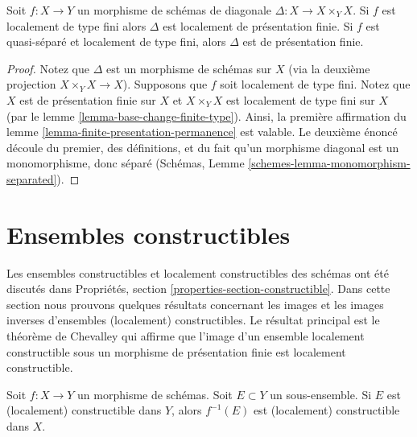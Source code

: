 \begin{lemma}
\label{lemma-diagonal-morphism-finite-type}
Soit $f : X \to Y$ un morphisme de schémas de diagonale $\Delta : X \to X \times_Y X$.
Si $f$ est localement de type fini alors $\Delta$
est localement de présentation finie. Si $f$ est quasi-séparé et
localement de type fini, alors $\Delta$ est de présentation finie.
\end{lemma}

\begin{proof}
Notez que $\Delta$ est un morphisme de schémas sur $X$
(via la deuxième projection $X \times_Y X \to X$). Supposons que $f$
soit localement de type fini. Notez que $X$ est de présentation
finie sur $X$ et $X \times_Y X$ est localement de type fini sur $X$
(par le lemme \ref{lemma-base-change-finite-type}).
Ainsi, la première affirmation du lemme
\ref{lemma-finite-presentation-permanence} est valable. Le deuxième énoncé découle du premier,
des définitions, et du fait qu'un morphisme diagonal est un monomorphisme,
donc séparé (Schémas, Lemme \ref{schemes-lemma-monomorphism-separated}).
\end{proof}








\section{Ensembles constructibles}
\label{section-constructible}

\noindent
Les ensembles constructibles et localement constructibles des schémas ont été discutés
dans Propriétés, section \ref{properties-section-constructible}. Dans cette section nous prouvons
quelques résultats concernant les images et les images inverses d'ensembles
(localement) constructibles. Le résultat principal est le théorème de Chevalley
qui affirme que l'image d'un ensemble localement constructible sous un morphisme
de présentation finie est localement constructible.

\begin{lemma}
\label{lemma-inverse-image-constructible}
Soit $f : X \to Y$ un morphisme de schémas. Soit $E \subset Y$
un sous-ensemble. Si $E$ est
(localement) constructible dans $Y$, alors $f^{-1}(E)$ est (localement) constructible
dans $X$.
\end{lemma}

